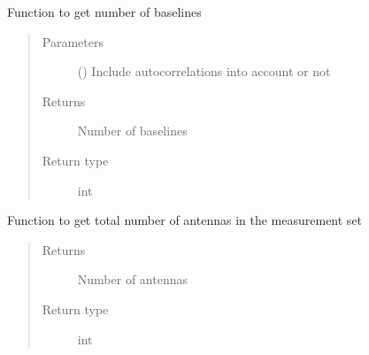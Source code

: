 \documentclass[letterpaper,10pt,english]{sphinxmanual}
\begin{document}
\begin{fulllineitems}
\begin{fulllineitems}
\end{fulllineitems}


\begin{fulllineitems}
\label{\detokenize{paircars:paircars.access_ms.AccessMS.get_nbaseline}}
\sphinxAtStartPar
Function to get number of baselines
\begin{quote}\begin{description}
\item[{Parameters}] \leavevmode
\sphinxAtStartPar
{} () \textendash{} Include auto\sphinxhyphen{}correlations into account or not

\item[{Returns}] \leavevmode
\sphinxAtStartPar
Number of baselines

\item[{Return type}] \leavevmode
\sphinxAtStartPar
int

\end{description}\end{quote}

\end{fulllineitems}


\begin{fulllineitems}
\label{\detokenize{paircars:paircars.access_ms.AccessMS.get_num_antenna}}
\sphinxAtStartPar
Function to get total number of antennas in the measurement set
\begin{quote}\begin{description}
\item[{Returns}] \leavevmode
\sphinxAtStartPar
Number of antennas

\item[{Return type}] \leavevmode
\sphinxAtStartPar
int

\end{description}\end{quote}


\end{fulllineitems}
\end{fulllineitems}
\end{document}

